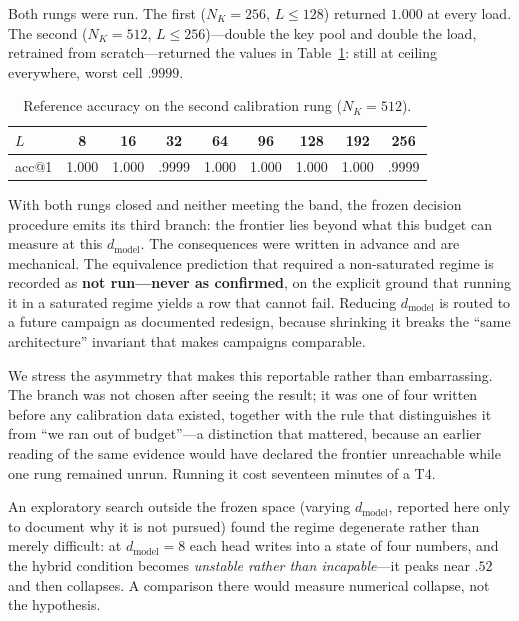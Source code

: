 \documentclass[jou,11pt,donotrepeattitle]{apa7}
\begin{document}
Both rungs were run. The first ($N_K=256$, $L\le128$) returned $1.000$ at every load. The
second ($N_K=512$, $L\le256$)---double the key pool and double the load, retrained from
scratch---returned the values in Table~\ref{tab:rungs}: still at ceiling everywhere, worst cell
$.9999$.

\begin{table}[htbp]
\centering
\caption{Reference accuracy on the second calibration rung ($N_K=512$).}
\label{tab:rungs}
\begin{tabular}{lcccccccc}
\toprule
$L$ & 8 & 16 & 32 & 64 & 96 & 128 & 192 & 256 \\
\midrule
acc@1 & 1.000 & 1.000 & .9999 & 1.000 & 1.000 & 1.000 & 1.000 & .9999 \\
\bottomrule
\end{tabular}
\end{table}

With both rungs closed and neither meeting the band, the frozen decision procedure emits its
third branch: the frontier lies beyond what this budget can measure at this $d_{\text{model}}$.
The consequences were written in advance and are mechanical. The equivalence prediction that
required a non-saturated regime is recorded as \textbf{not run---never as confirmed}, on the
explicit ground that running it in a saturated regime yields a row that cannot fail. Reducing
$d_{\text{model}}$ is routed to a future campaign as documented redesign, because shrinking it
breaks the ``same architecture'' invariant that makes campaigns comparable.

We stress the asymmetry that makes this reportable rather than embarrassing. The branch was not
chosen after seeing the result; it was one of four written before any calibration data existed,
together with the rule that distinguishes it from ``we ran out of budget''---a distinction that
mattered, because an earlier reading of the same evidence would have declared the frontier
unreachable while one rung remained unrun. Running it cost seventeen minutes of a T4.

An exploratory search outside the frozen space (varying $d_{\text{model}}$, reported here only
to document why it is not pursued) found the regime degenerate rather than merely difficult: at
$d_{\text{model}}=8$ each head writes into a state of four numbers, and the hybrid condition
becomes \emph{unstable rather than incapable}---it peaks near $.52$ and then collapses. A
comparison there would measure numerical collapse, not the hypothesis.
\end{document}
